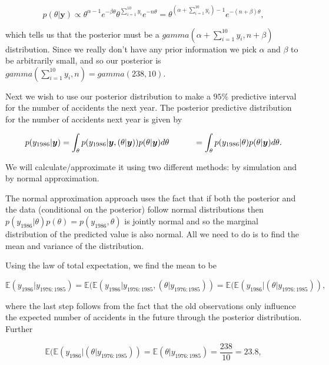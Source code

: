 \documentclass[]{article}
\begin{document}
\[\begin{equation}
p(\theta|\boldsymbol{y}) \propto \theta^{\alpha-1}e^{-\beta \theta}\theta^{\sum_{i=1}^{10} y_i}e^{-n\theta}=\theta^{(\alpha + \sum_{i=1}^{10} y_i) - 1}e^{-(n+\beta)\theta},
\end{equation}\]

which tells us that the posterior must be a
\(gamma(\alpha + \sum_{i=1}^{10} y_i, n+\beta)\) distribution. Since we
really don't have any prior information we pick \(\alpha\) and \(\beta\)
to be arbitrarily small, and so our posterior is
\(gamma(\sum_{i=1}^{10} y_i, n)=gamma(238, 10)\).

Next we wish to use our posterior distribution to make a \(95 \%\)
predictive interval for the number of accidents the next year. The
posterior predictive distribution for the number of accidents next year
is given by

\[\begin{equation}
p(y_{1986}|\boldsymbol{y}) = \int_{\theta} p(y_{1986}|\boldsymbol{y}, (\theta|\boldsymbol{y})) p(\theta|\boldsymbol{y}) d\theta \\ \qquad \quad =\int_{\theta} p(y_{1986}|\theta) p(\theta|\boldsymbol{y}) d\theta. 
\end{equation}\]

We will calculate/approximate it using two different methods: by
simulation and by normal approximation.

The normal approximation approach uses the fact that if both the
posterior and the data (conditional on the posterior) follow normal
distributions then \(p(y_{1986}|\theta) p(\theta)=p(y_{1986},\theta)\)
is jointly normal and so the marginal distribution of the predicted
value is also normal. All we need to do is to find the mean and variance
of the distribution.

Using the law of total expectation, we find the mean to be

\[\begin{equation}
\mathbb{E}(y_{1986}|y_{1976:1985})=\mathbb{E}(\mathbb{E}(y_{1986}|y_{1976:1985},(\theta|y_{1976:1985}))=\mathbb{E}(\mathbb{E}(y_{1986}|(\theta|y_{1976:1985})),
\end{equation}\]

where the last step follows from the fact that the old observations only
influence the expected number of accidents in the future through the
posterior distribution. Further

\[\begin{equation}
\mathbb{E}(\mathbb{E}(y_{1986}|(\theta|y_{1976:1985}))=\mathbb{E}(\theta|y_{1976:1985})=\frac{238}{10}=23.8,
\end{equation}\]
\end{document}
